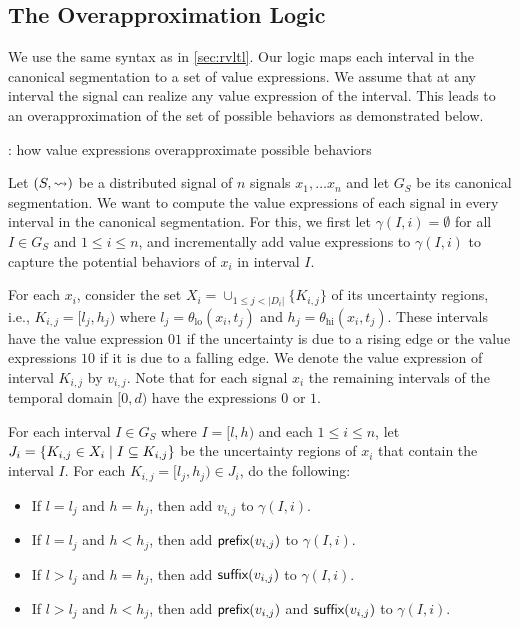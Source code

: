 %

\subsection{The Overapproximation Logic}
We use the same syntax as in \cref{sec:rvltl}.
Our logic maps each interval in the canonical segmentation to a set of value expressions.
We assume that at any interval the signal can realize any value expression of the interval.
This leads to an overapproximation of the set of possible behaviors as demonstrated below.

\begin{example}
	\TODO: how value expressions overapproximate possible behaviors
\end{example}

Let $(S,{\rightsquigarrow})$ be a distributed signal of $n$ signals $x_1, \ldots x_n$ and let $G_S$ be its canonical segmentation.
We want to compute the value expressions of each signal in every interval in the canonical segmentation.
For this, we first let $\gamma(I, i) = \emptyset$ for all $I \in G_S$ and $1 \leq i \leq n$, and incrementally add value expressions to $\gamma(I, i)$ to capture the potential behaviors of $x_i$ in interval $I$.

For each $x_i$, consider the set $X_i = \cup_{1 \leq j < |D_i|} \{K_{i,j}\}$ of its uncertainty regions, i.e.,  $K_{i,j} = [l_j, h_j)$ where $l_j = \theta_{\text{lo}}(x_i, t_j)$ and $h_j = \theta_{\text{hi}}(x_i, t_j)$.
These intervals have the value expression $01$ if the uncertainty is due to a rising edge or the value expressions $10$ if it is due to a falling edge.
We denote the value expression of interval $K_{i,j}$ by $v_{i,j}$.
Note that for each signal $x_i$ the remaining intervals of the temporal domain $[0,d)$ have the expressions $0$ or $1$.

For each interval $I \in G_S$ where $I = [l,h)$ and each $1 \leq i \leq n$, let $J_i = \{ K_{i,j} \in X_i \st I \subseteq K_{i,j}\}$ be the uncertainty regions of $x_i$ that contain the interval $I$.
For each $K_{i,j} = [l_j, h_j) \in J_i$, do the following:
\begin{itemize}
	\item If $l = l_j$ and $h = h_j$, then add $v_{i,j}$ to $\gamma(I, i)$.
	\item If $l = l_j$ and $h < h_j$, then add $\textsf{prefix}(v_{i,j})$ to $\gamma(I,i)$.
	\item If $l > l_j$ and $h = h_j$, then add $\textsf{suffix}(v_{i,j})$ to $\gamma(I,i)$.
	\item If $l > l_j$ and $h < h_j$, then add $\textsf{prefix}(v_{i,j})$ and $\textsf{suffix}(v_{i,j})$ to $\gamma(I,i)$.
\end{itemize}

